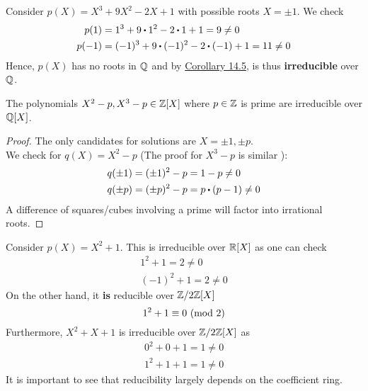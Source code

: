 \documentclass[../Main.tex]{subfiles}
\begin{document}
\begin{example}
	Consider $p(X) = X^3+9X^2-2X+1$ with possible roots $X=\pm 1$. We check
	\begin{align*}
	p(1)&=1^3+9\rdot 1^2-2\rdot 1+1=9\ne 0\\
	p(-1)&=(-1)^3+9\rdot (-1)^2-2\rdot (-1)+1 = 11 \ne 0 
	\end{align*}
	Hence, $p(X)$ has no roots in $\mathbb{Q}$ and by \hyperref[co:14.5]{Corollary 14.5}, is thus \textbf{irreducible} over $\mathbb{Q}$.
\end{example}
\begin{claim}
	The polynomials $X^2-p,X^3-p \in \mathbb{Z}[X]$ where $p\in \mathbb{Z}$ is prime are irreducible over $\mathbb{Q}[X]$.
\end{claim}
\begin{proof}
	The only candidates for solutions are $X=\pm 1, \pm p$. \\
	We check for $q(X)=X^2-p$ (The proof for $X^3-p$ is similar ):
	\begin{align*}
	&q(\pm 1) = (\pm 1)^2-p = 1-p \ne 0\\
	&q(\pm p) = (\pm p)^2-p = p\rdot (p-1)\ne 0 \qedhere
	\end{align*}
	A difference of squares/cubes involving a prime will factor into irrational roots.
\end{proof}
\begin{example}
	Consider $p(X)=X^2+1$. This is irreducible over $\mathbb{R}[X]$ as one can check
	\begin{align*}
	1^2+1=2 \ne 0\\
	(-1)^2+1=2\ne 0
	\end{align*}
	On the other hand, it \textbf{is} reducible over $\mathbb{Z}/2\mathbb{Z}[X]$ 
	\[1^2+1 \equiv 0 \ (\mathrm{mod}\ 2)\]
	Furthermore, $X^2+X+1$ is irreducible over $\mathbb{Z}/2\mathbb{Z}[X]$ as
	\begin{align*}
	0^2+0+1=1\ne 0\\
	1^2+1+1=1\ne 0
	\end{align*}
	It is important to see that reducibility largely depends on the coefficient ring.
\end{example}
\end{document}
